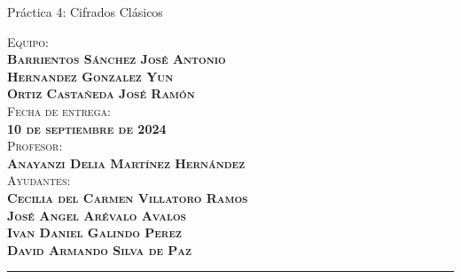 \begin{titlepage}
    \vspace{2cm}
    
    \begin{center}
        {\Huge Práctica 4: Cifrados Clásicos}
    \end{center}
    
    \vspace{2cm}
    
    \begin{center}
        \large

        \textsc{Equipo: \\
                \textbf{Barrientos Sánchez José Antonio\\
                Hernandez Gonzalez Yun\\
                Ortiz Castañeda José Ramón}}\\[0.5cm]     
                
                \textsc{{Fecha de entrega: \\ \textbf{10 de septiembre de 2024}}}\\[0.5cm]        

                \textsc{{Profesor: \\ \textbf{ Anayanzi Delia Martínez Hernández}}}\\[0.5cm]  

                \textsc{Ayudantes: \\\textbf{Cecilia del Carmen Villatoro Ramos \\
                José Angel Arévalo Avalos \\
                Ivan Daniel Galindo Perez \\
                David Armando Silva de Paz}}
    \end{center}
    
    \vfill
    
    \begin{center}
        \rule{17cm}{0.1mm}
    \end{center}
    
\end{titlepage}

\restoregeometry %
